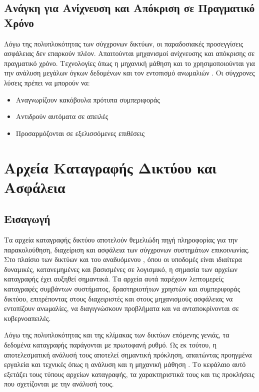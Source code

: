 \subsection{Ανάγκη για Ανίχνευση και Απόκριση σε Πραγματικό Χρόνο}

Λόγω της πολυπλοκότητας των σύγχρονων δικτύων, οι παραδοσιακές προσεγγίσεις ασφάλειας δεν επαρκούν πλέον. Απαιτούνται μηχανισμοί ανίχνευσης και απόκρισης σε πραγματικό χρόνο. Τεχνολογίες όπως η μηχανική μάθηση και το  χρησιμοποιούνται για την ανάλυση μεγάλων όγκων δεδομένων και τον εντοπισμό ανωμαλιών \cite{nguyen2018deep,ilias2025convolutional}. Οι σύγχρονες λύσεις πρέπει να μπορούν να:
\begin{itemize}
    \item Αναγνωρίζουν κακόβουλα πρότυπα συμπεριφοράς
    \item Αντιδρούν αυτόματα σε απειλές
    \item Προσαρμόζονται σε εξελισσόμενες επιθέσεις
\end{itemize}

\section{Αρχεία Καταγραφής Δικτύου και Ασφάλεια}

\subsection{Εισαγωγή}

Τα αρχεία καταγραφής δικτύου αποτελούν θεμελιώδη πηγή πληροφορίας για την παρακολούθηση, διαχείριση και ασφάλεια των σύγχρονων συστημάτων επικοινωνίας. Στο πλαίσιο των δικτύων  και του αναδυόμενου , όπου οι υποδομές είναι ιδιαίτερα δυναμικές, κατανεμημένες και βασισμένες σε λογισμικό, η σημασία των αρχείων καταγραφής έχει αυξηθεί σημαντικά. Τα αρχεία αυτά παρέχουν λεπτομερείς καταγραφές συμβάντων συστήματος, δραστηριοτήτων χρηστών και συμπεριφοράς δικτύου, επιτρέποντας στους διαχειριστές και στους μηχανισμούς ασφάλειας να εντοπίζουν ανωμαλίες, να διαγιγνώσκουν προβλήματα και να ανταποκρίνονται σε κυβερνοαπειλές.

Λόγω της πολυπλοκότητας και της κλίμακας των δικτύων επόμενης γενιάς, τα δεδομένα καταγραφής παράγονται με πρωτοφανή ρυθμό. Ως εκ τούτου, η αποτελεσματική ανάλυσή τους αποτελεί σημαντική πρόκληση, απαιτώντας προηγμένα εργαλεία και τεχνικές όπως η ανάλυση  και η μηχανική μάθηση \cite{behl2017cybersecurity}. Το κεφάλαιο αυτό εξετάζει τους τύπους αρχείων καταγραφής, τα χαρακτηριστικά τους και τις προκλήσεις που σχετίζονται με την ανάλυσή τους.

